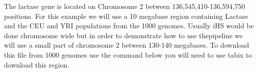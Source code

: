 \documentclass[a4paper,10pt]{article}
\begin{document}
The lactase gene is located on Chromosome 2 between 136,545,410-136,594,750 positions. For this example we will use a 10 megabase region containing Lactase and the CEU and YRI populations from the 1000 genomes. Usually iHS would be done chromosome wide but in order to demonstrate how to use thepipeline we will use a small part of chromosome 2 between 130-140 megabases. To download this file from 1000 genomes use the command below you will need to use tabix to download this region.

\begin{lstlisting}[language=Bash]

\end{lstlisting}




\end{document}
